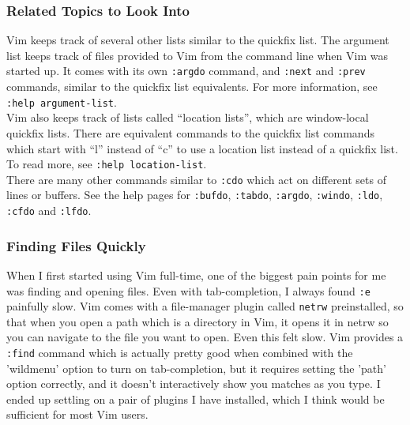 \documentclass{beamer}
\begin{document}
\begin{frame}[fragile]
	\frametitle{Related Topics to Look Into}
	\small
	Vim keeps track of several other lists similar to the quickfix list. The argument list keeps track of files provided to Vim from the command line when Vim was started up. It comes with its own \verb+:argdo+ command, and \verb+:next+ and \verb+:prev+ commands, similar to the quickfix list equivalents. For more information, see \verb+:help argument-list+. \\
	\vspace{0.5cm}
	Vim also keeps track of lists called \enquote{location lists}, which are window-local quickfix lists. There are equivalent commands to the quickfix list commands which start with \enquote{l} instead of \enquote{c} to use a location list instead of a quickfix list. To read more, see \verb+:help location-list+.\\
	\vspace{0.5cm}
	There are many other commands similar to \verb+:cdo+ which act on different sets of lines or buffers. See the help pages for \verb+:bufdo+, \verb+:tabdo+, \verb+:argdo+, \verb+:windo+, \verb+:ldo+, \verb+:cfdo+ and \verb+:lfdo+.
\end{frame}

\begin{frame}[fragile]
    \frametitle{Finding Files Quickly}
    \small
	When I first started using Vim full-time, one of the biggest pain points for me was finding and opening files. Even with tab-completion, I always found \verb+:e+ painfully slow. Vim comes with a file-manager plugin called \verb+netrw+ preinstalled, so that when you open a path which is a directory in Vim, it opens it in netrw so you can navigate to the file you want to open. Even this felt slow. Vim provides a \verb+:find+ command which is actually pretty good when combined with the 'wildmenu' option to turn on tab-completion, but it requires setting the 'path' option correctly, and it doesn't interactively show you matches as you type. I ended up settling on a pair of plugins I have installed, which I think would be sufficient for most Vim users.\\
\end{frame}
\end{document}
